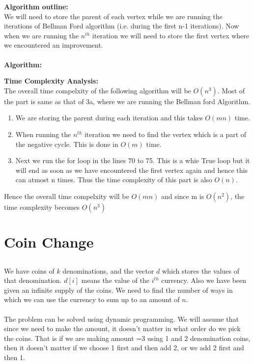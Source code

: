 \documentclass{article}
\begin{document}
\textbf{Algorithm outline:}\\
We will need to store the parent of each vertex while we are running the iterations of Bellman Ford algorithm (i.e. during the first n-1 iterations). Now when we are running the $n^{th}$ iteration we will need to store the first vertex where we encountered an improvement. 
\\\\
\textbf{Algorithm:}

\textbf{Time Complexity Analysis:}\\
The overall time compelxity of the following algorithm will be $O(n^3)$. Most of the part is same as that of 3a, where we are running the Bellman ford Algorithm.
\begin{enumerate}
    \item We are storing the parent during each iteration and this takes $O(mn)$ time. 
    \item When running the $n^{th}$ iteration we need to find the vertex which is a part of the negative cycle. This is done in $O(m)$ time.
    \item Next we run the for loop in the lines 70 to 75. This is a whie True loop but it will end as soon as we have encountered the first vertex again and hence this can atmost n times. Thus the time complexity of this part is also $O(n)$.
\end{enumerate}
Hence the overall time compelxity will be $O(mn)$ and since m is $O(n^2)$, the time complexity becomes $O(n^3)$
\newpage
\section{Coin Change}

\subsection{}
We have coins of $k$ denominations, and the vector $d$ which stores the values of that denomination. $d[i]$ means the value of the $i^{th}$ currency. Also we have been given an infinite supply of the coins. We need to find the number of ways in which we can use the currency to sum up to an amount of $n$.
\\\\
The problem can be solved using dynamic programming. We will assume that since we need to make the amount, it doesn't matter in what order do we pick the coins. That is if we are making amount =3 using 1 and 2 denomination coins, then it doesn't matter if we choose 1 first and then add 2, or we add 2 first and then 1.  
\end{document}

